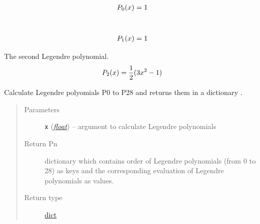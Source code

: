 \documentclass[a4paper,10pt,english]{sphinxmanual}
\begin{document}
\begin{fulllineitems}
\label{api/climlab.utils:climlab.utils.legendre.P0}~\begin{gather}
\begin{split}P_0 (x) = 1\end{split}\notag
\end{gather}
\end{fulllineitems}


\begin{fulllineitems}
\label{api/climlab.utils:climlab.utils.legendre.P1}~\begin{gather}
\begin{split}P_1 (x) = 1\end{split}\notag
\end{gather}
\end{fulllineitems}


\begin{fulllineitems}
\label{api/climlab.utils:climlab.utils.legendre.P2}
The second Legendre polynomial.
\begin{gather}
\begin{split}P_2(x) = \frac{1}{2} (3x^2 - 1)\end{split}\notag
\end{gather}
\end{fulllineitems}


\begin{fulllineitems}
\label{api/climlab.utils:climlab.utils.legendre.Pn}
Calculate Legendre polyomials P0 to P28 and returns them 
in a dictionary .
\begin{quote}\begin{description}
\item[{Parameters}] \leavevmode
\textbf{\texttt{x}} (\href{http://docs.python.org/2.7/library/functions.html\#float}{\emph{float}}) -- argument to calculate Legendre polynomials

\item[{Return Pn}] \leavevmode
dictionary which contains order of Legendre polynomials
(from 0 to 28) as keys and the corresponding evaluation
of Legendre polynomials as values.

\item[{Return type}] \leavevmode
\href{http://docs.python.org/2.7/library/stdtypes.html\#dict}{dict}

\end{description}\end{quote}

\end{fulllineitems}
\end{document}
